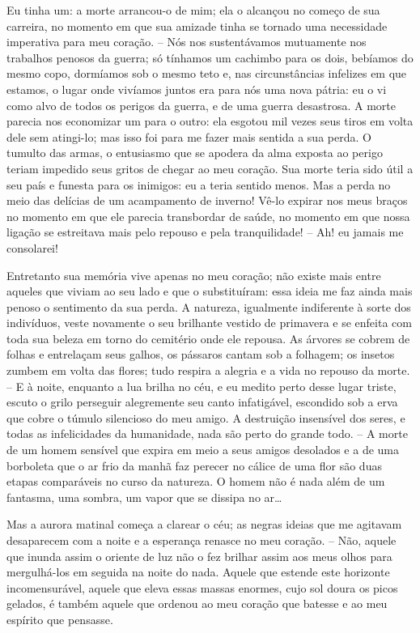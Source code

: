  Eu tinha um: a morte arrancou-o de mim; ela o alcançou no começo de sua
carreira, no momento em que sua amizade tinha se tornado uma
necessidade imperativa para meu coração. -- Nós nos sustentávamos
mutuamente nos trabalhos penosos da guerra; só tínhamos um cachimbo
para os dois, bebíamos do mesmo copo, dormíamos sob o mesmo teto e, nas
circunstâncias infelizes em que estamos, o lugar onde vivíamos juntos
era para nós uma nova pátria: eu o vi como alvo de todos os perigos da
guerra, e de uma guerra desastrosa. A morte parecia nos economizar um
para o outro: ela esgotou mil vezes seus tiros em volta dele sem
atingi-lo; mas isso foi para me fazer mais sentida a sua perda. O
tumulto das armas, o entusiasmo que se apodera da alma exposta ao
perigo teriam impedido seus gritos de chegar ao meu coração. Sua morte
teria sido útil a seu país e funesta para os inimigos: eu a teria
sentido menos. Mas a perda no meio das delícias de um acampamento de
inverno! Vê-lo expirar nos meus braços no momento em que ele parecia
transbordar de saúde, no momento em que nossa ligação se estreitava
mais pelo repouso e pela tranquilidade! -- Ah! eu jamais me
consolarei!

 Entretanto sua memória vive apenas no meu coração; não existe mais
entre aqueles que viviam ao seu lado e que o substituíram: essa ideia
me faz ainda mais penoso o sentimento da sua perda. A natureza,
igualmente indiferente à sorte dos indivíduos, veste novamente o seu
brilhante vestido de primavera e se enfeita com toda sua beleza em
torno do cemitério onde ele repousa. As árvores se cobrem de folhas e
entrelaçam seus galhos, os pássaros cantam sob a folhagem; os insetos
zumbem em volta das flores; tudo respira a alegria e a vida no repouso
da morte. -- E à noite, enquanto a lua brilha no céu, e eu medito
perto desse lugar triste, escuto o grilo perseguir alegremente seu
canto infatigável, escondido sob a erva que cobre o túmulo silencioso
do meu amigo. A destruição insensível dos seres, e todas as
infelicidades da humanidade, nada são perto do grande todo. -- A morte
de um homem sensível que expira em meio a seus amigos desolados e a de
uma borboleta que o ar frio da manhã faz perecer no cálice de uma flor
são duas etapas comparáveis no curso da natureza. O homem não é nada
além de um fantasma, uma sombra, um vapor que se dissipa no ar\ldots

 Mas a aurora matinal começa a clarear o céu; as negras ideias que me
agitavam desaparecem com a noite e a esperança renasce no meu coração.
-- Não, aquele que inunda assim o oriente de luz não o fez brilhar
assim aos meus olhos para mergulhá-los em seguida na noite do nada.
Aquele que estende este horizonte incomensurável, aquele  que eleva
essas massas enormes, cujo sol doura os picos gelados, é também aquele
que ordenou ao meu coração que batesse e ao meu espírito que pensasse.

